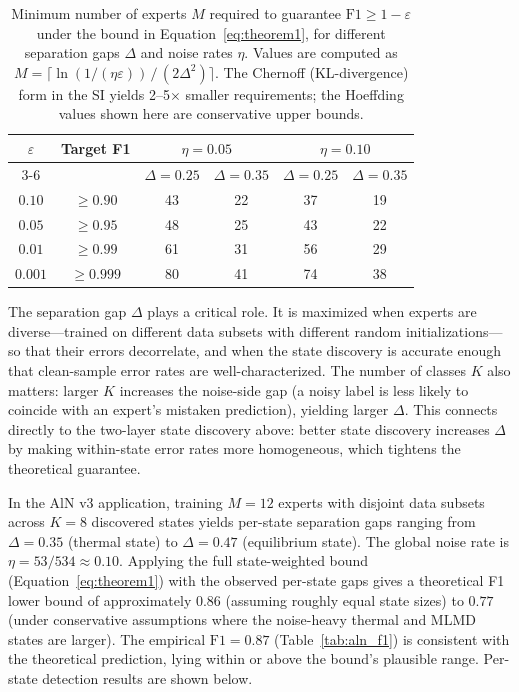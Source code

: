 \begin{table}[t]
\caption{Minimum number of experts $M$ required to guarantee $\mathrm{F1} \geq 1 - \varepsilon$ under the bound in Equation~\eqref{eq:theorem1}, for different separation gaps $\Delta$ and noise rates $\eta$. Values are computed as $M = \lceil \ln(1/(\eta\varepsilon)) \,/\, (2\Delta^2) \rceil$. The Chernoff (KL-divergence) form in the SI yields 2--5$\times$ smaller requirements; the Hoeffding values shown here are conservative upper bounds.}
\label{tab:f1_guarantee}
\begin{ruledtabular}
\begin{tabular}{cccccc}
\toprule
\multirow{2}{*}{$\varepsilon$} & \multirow{2}{*}{Target F1} & \multicolumn{2}{c}{$\eta = 0.05$} & \multicolumn{2}{c}{$\eta = 0.10$} \\
\cmidrule{3-6}
& & $\Delta = 0.25$ & $\Delta = 0.35$ & $\Delta = 0.25$ & $\Delta = 0.35$ \\
\midrule
$0.10$ & $\geq 0.90$ & 43 & 22 & 37 & 19 \\
$0.05$ & $\geq 0.95$ & 48 & 25 & 43 & 22 \\
$0.01$ & $\geq 0.99$ & 61 & 31 & 56 & 29 \\
$0.001$ & $\geq 0.999$ & 80 & 41 & 74 & 38 \\
\bottomrule
\end{tabular}
\end{ruledtabular}
\end{table}

The separation gap $\Delta$ plays a critical role. It is maximized when experts are diverse---trained on different data subsets with different random initializations---so that their errors decorrelate, and when the state discovery is accurate enough that clean-sample error rates are well-characterized. The number of classes $K$ also matters: larger $K$ increases the noise-side gap (a noisy label is less likely to coincide with an expert's mistaken prediction), yielding larger $\Delta$. This connects directly to the two-layer state discovery above: better state discovery increases $\Delta$ by making within-state error rates more homogeneous, which tightens the theoretical guarantee.

In the AlN v3 application, training $M = 12$ experts with disjoint data subsets across $K = 8$ discovered states yields per-state separation gaps ranging from $\Delta = 0.35$ (thermal state) to $\Delta = 0.47$ (equilibrium state). The global noise rate is $\eta = 53/534 \approx 0.10$. Applying the full state-weighted bound (Equation~\ref{eq:theorem1}) with the observed per-state gaps gives a theoretical F1 lower bound of approximately $0.86$ (assuming roughly equal state sizes) to $0.77$ (under conservative assumptions where the noise-heavy thermal and MLMD states are larger). The empirical $\mathrm{F1} = 0.87$ (Table~\ref{tab:aln_f1}) is consistent with the theoretical prediction, lying within or above the bound's plausible range. Per-state detection results are shown below.


